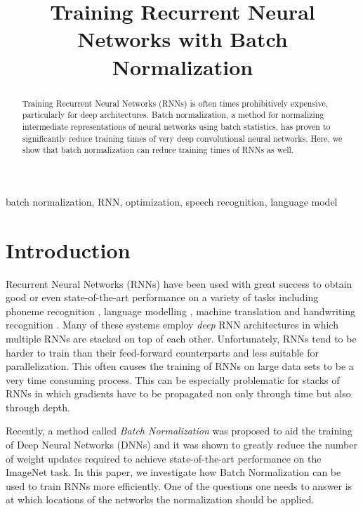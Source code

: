 \documentclass{article}
\title{Training Recurrent Neural Networks with Batch Normalization}
\begin{document}
%
\maketitle
%
\begin{abstract}
Training Recurrent Neural Networks (RNNs) is often times prohibitively expensive, particularly 
for deep architectures. Batch normalization, a method for normalizing intermediate 
representations of neural networks using batch statistics, has proven to significantly reduce 
training times of very deep convolutional neural networks. Here, we show that batch normalization 
can reduce training times of RNNs as well.

\end{abstract}
%
\begin{keywords}
batch normalization, RNN, optimization, speech recognition, language model
\end{keywords}
%
\section{Introduction}

Recurrent Neural Networks (RNNs) have been used with great success to
obtain good or even state-of-the-art performance on a variety of tasks including phoneme
recognition \citep{graves2013speech}, language modelling
\citep{mikolov2012thesis}, machine translation
\citep{sutskever2014sequence,bahdanau2014,cho2014properties,kalchbrenner2013}
and handwriting recognition \citep{graves2009offline}.
Many of these systems employ \emph{deep} RNN architectures in which multiple
RNNs are stacked on top of each other.
Unfortunately, RNNs tend to be harder to train than their feed-forward
counterparts and less suitable for parallelization. This often causes the
training of RNNs on large data sets to be a very time consuming process.
This can be especially problematic for stacks of RNNs in which gradients have
to be propagated non only through time but also through depth.

Recently, a method called \emph{Batch Normalization} was proposed to aid the
training of Deep Neural Networks (DNNs) \citep{ioffe2015} and it was shown to
greatly reduce the number of weight updates required to achieve
state-of-the-art performance on the ImageNet task.
In this paper, we investigate how Batch Normalization can be used to train RNNs
more efficiently. One of the questions one needs to answer is at which
locations of the networks the normalization should be applied.
\end{document}
